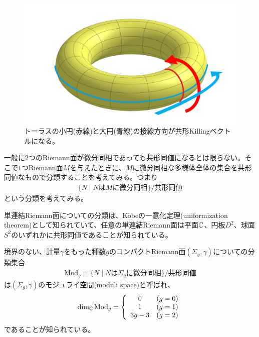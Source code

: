 \begin{ex}
\begin{figure}[h]
	\centering
	\includegraphics[width=0.7\linewidth]{torusCKV.pdf}
	\caption{トーラスの小円(赤線)と大円(青線)の接線方向が共形Killingベクトルになる。}
	\label{fig:torusckv}
\end{figure}


一般に$2$つのRiemann面が微分同相であっても共形同値になるとは限らない。そこで$1$つRiemann面$M$を与えたときに、$M$に微分同相な多様体全体の集合を共形同値なもので分類することを考えてみる。つまり
\begin{align}
\{ N\mid N\text{は}M\text{に微分同相} \}/\text{共形同値}
\end{align}
という分類を考えてみる。

単連結Riemann面についての分類は、K\"{o}beの一意化定理(uniformization theorem)として知られていて、任意の単連結Riemann面は平面$\mathbb{C}$、円板$D^2$、球面$S^2$のいずれかに共形同値であることが知られている。

境界のない、計量$\gamma$をもった種数$g$のコンパクトRiemann面$(\Sigma_g,\gamma)$についての分類集合
\begin{align}
\text{Mod}_g=\{ N\mid N\text{は}\Sigma_g\text{に微分同相} \}/\text{共形同値}
\end{align}
は$(\Sigma_g,\gamma)$のモジュライ空間(moduli space)と呼ばれ、
\begin{align}
\dim_{\mathbb{C}} \text{Mod}_g=\left\{ \begin{array}{cc}   
0 &(g=0)\\
1 &(g=1)\\
3g-3 &(g=2)
\end{array}\right.
\end{align}
であることが知られている。


\end{ex}
